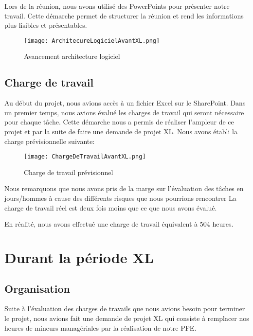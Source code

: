 Lors de la réunion, nous avons utilisé des PowerPoints pour présenter notre travail.
Cette démarche permet de structurer la réunion et rend les informations plus lisibles et présentables. 

\begin{figure}[h!]
  \centering
  \texttt{[image: ArchitecureLogicielAvantXL.png]}
	\caption[]{Avancement architecture logiciel}
	\label{}
\end{figure}




\subsection{Charge de travail}
Au début du projet, nous avions accès à un fichier Excel sur le SharePoint.
Dans un premier temps, nous avions évalué les charges de travail qui seront nécessaire pour chaque tâche.
Cette démarche nous a permis de réaliser l'ampleur de ce projet et par la suite de faire une demande de projet XL\@. 
Nous avons établi la charge prévisionnelle suivante:

\begin{figure}[h!]
  \centering
  \texttt{[image: ChargeDeTravailAvantXL.png]}
	\caption[]{Charge de travail prévisionnel}
	\label{}
\end{figure}

Nous remarquons que nous avons pris de la marge sur l'évaluation des tâches en jours/hommes à cause des différents risques que nous pourrions rencontrer
La charge de travail réel est deux fois moins que ce que nous avons évalué. 

En réalité, nous avons effectué une charge de travail équivalent à 504 heures.





\section{Durant la période XL}

\subsection{Organisation}
Suite à l'évaluation des charges de travails que nous avions besoin pour terminer le projet, nous avions fait une demande de projet XL qui consiste à remplacer nos heures de mineurs managériales par la réalisation de notre PFE\@.

